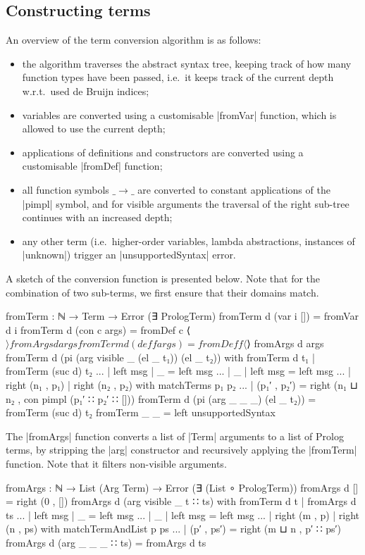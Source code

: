 \documentclass[preprint]{sigplanconf}
\begin{document}
\subsection*{Constructing terms}

An overview of the term conversion algorithm is as follows:
\begin{itemize}
\item %
  the algorithm traverses the abstract syntax tree, keeping track of
  how many function types have been passed, i.e.\ it keeps track of the
  current depth w.r.t.\ used de Bruijn indices;
\item %
  variables are converted using a customisable |fromVar| function,
  which is allowed to use the current depth;
\item %
  applications of definitions and constructors are converted using a
  customisable |fromDef| function;
\item %
  all function symbols $\_\!\!\to\!\!\_$ are converted to constant
  applications of the |pimpl| symbol, and for visible arguments the
  traversal of the right sub-tree continues with an increased depth;
\item %
  any other term (i.e.\ higher-order variables, lambda abstractions,
  instances of |unknown|) trigger an |unsupportedSyntax| error.
\end{itemize}
A sketch of the conversion function is presented below. Note that for
the combination of two sub-terms, we first ensure that their domains
match.
\begin{code}
fromTerm : ℕ → Term → Error (∃ PrologTerm)
fromTerm d (var i [])    = fromVar d i
fromTerm d (con c args)  = fromDef c ⟨$⟩ fromArgs d args
fromTerm d (def f args)  = fromDef f ⟨$⟩ fromArgs d args
fromTerm d (pi (arg visible _ (el _ t₁)) (el _ t₂))
  with fromTerm d t₁ | fromTerm (suc d) t₂
... | left msg         | _         = left msg
... | _                | left msg  = left msg
... | right (n₁ , p₁)  | right (n₂ , p₂)
  with matchTerms p₁ p₂
... | (p₁′ , p₂′) = right (n₁ ⊔ n₂ , con pimpl (p₁′ ∷ p₂′ ∷ []))
fromTerm d (pi (arg _ _ _) (el _ t₂)) = fromTerm (suc d) t₂
fromTerm _ _  = left unsupportedSyntax
\end{code}
The |fromArgs| function converts a list of |Term| arguments to a list
of Prolog terms, by stripping the |arg| constructor and recursively
applying the |fromTerm| function. Note that it filters non-visible
arguments.
\begin{code}
fromArgs : ℕ → List (Arg Term) → Error (∃ (List ∘ PrologTerm))
fromArgs d [] = right (0 , [])
fromArgs d (arg visible _ t ∷ ts) with fromTerm d t | fromArgs d ts
... | left msg       | _              = left msg
... | _              | left msg       = left msg
... | right (m , p)  | right (n , ps) with matchTermAndList p ps
... | (p′ , ps′)                      = right (m ⊔ n , p′ ∷ ps′)
fromArgs d (arg _ _ _ ∷ ts)           = fromArgs d ts
\end{code}
\end{document}
